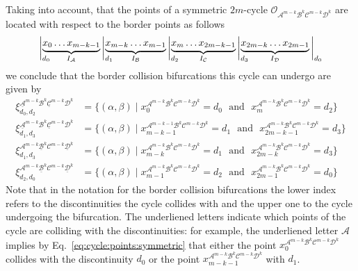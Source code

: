 \documentclass[10pt]{article}
\newcommand{\A}{{\mathcal A}}
\newcommand{\B}{{\mathcal B}}
\newcommand{\C}{{\mathcal C}}
\newcommand{\D}{{\mathcal D}}
\newcommand{\LC}{{\mathcal O}}
\begin{document}
Taking into account, that the points of a symmetric $2m$-cycle
$\LC_{\A^{m-k}\B^k\C^{m-k}\D^k}$ are located with respect to the
border points as follows
\begin{equation}
	\label{eq:cycle:points:symmetric}
	\raisebox{-1.2ex}{$\bigg|_{d_0}$\hspace*{-1em}}
	\underbrace{x_0 \dots x_{m-k-1}}_{I_\A}
	\raisebox{-1.2ex}{$\bigg|_{d_1}$\hspace*{-1em}}
	\underbrace{x_{m-k} \dots x_{m-1}}_{I_\B}
	\raisebox{-1.2ex}{$\bigg|_{d_2}$\hspace*{-1em}}
	\underbrace{x_{m} \dots x_{2m-k-1}}_{I_\C}
	\raisebox{-1.2ex}{$\bigg|_{d_3}$\hspace*{-1em}}
	\underbrace{x_{2m-k} \dots x_{2m-1}}_{I_\D}
	\raisebox{-1.2ex}{$\bigg|_{d_0}$}
\end{equation}
we conclude that the border collision bifurcations this cycle can
undergo are given by
\begin{align}
	\label{eq:BCB:symmetric}
	\xi^{\underline{\A}^{m-k}\B^k\underline{\C}^{m-k}\D^k}_{d_0, d_2} & =
	\{ (\alpha,\beta) \mid
	x_0^{\A^{m-k}\B^k\C^{m-k}\D^k} = d_0
	\:\:\:\text{and}\:\:\:
	x_{m}^{\A^{m-k}\B^k\C^{m-k}\D^k} = d_2
	\}                                                                    \\
	\xi^{\underline{\A}^{m-k}\B^k\underline{\C}^{m-k}\D^k}_{d_1, d_3} & =
	\{ (\alpha,\beta) \mid
	x_{m-k-1}^{\A^{m-k-1}\B^k\C^{m-k}\D^k} = d_1
	\:\:\:\text{and}\:\:\:
	x_{2m-k-1}^{\A^{m-k}\B^k\C^{m-k}\D^k} = d_3
	\}                                                                    \\
	\xi^{\A^{m-k}\underline{\B}^k\C^{m-k}\underline{\D}^k}_{d_1, d_3} & =
	\{ (\alpha,\beta) \mid
	x_{m-k}^{\A^{m-k}\B^k\C^{m-k}\D^k} = d_1
	\:\:\:\text{and}\:\:\:
	x_{2m-k}^{\A^{m-k}\B^k\C^{m-k}\D^k} = d_3
	\}                                                                    \\
	\xi^{\A^{m-k}\underline{\B}^k\C^{m-k}\underline{\D}^k}_{d_2, d_0} & =
	\{ (\alpha,\beta) \mid
	x_{m-1}^{\A^{m-k}\B^k\C^{m-k}\D^k} = d_2
	\:\:\:\text{and}\:\:\:
	x_{2m-1}^{\A^{m-k}\B^k\C^{m-k}\D^k} = d_0
	\}
\end{align}
Note that in the notation for the border collision bifurcations the
lower index refers to the discontinuities the cycle collides with and
the upper one to the cycle undergoing the bifurcation.  The
underliened letters indicate which points of the cycle are colliding
with the discontinuities: for example, the underliened letter $\A$
implies by Eq.~\eqref{eq:cycle:points:symmetric} that either the point
$x^{\A^{m-k}\B^k\C^{m-k}\D^k}_0$ collides with the discontinuity $d_0$
or the point $x^{\A^{m-k}\B^k\C^{m-k}\D^k}_{m-k-1}$ with $d_1$.
\end{document}
